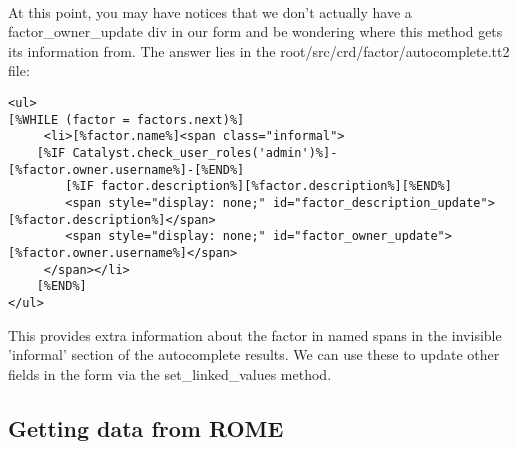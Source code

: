 \paragraph*{}
At this point, you may have notices that we don't actually have a factor\_owner\_update div in our form and be wondering where this method gets its information from. The answer lies in the root/src/crd/factor/autocomplete.tt2 file:

\begin{verbatim}
<ul>
[%WHILE (factor = factors.next)%]
     <li>[%factor.name%]<span class="informal">
	[%IF Catalyst.check_user_roles('admin')%]-[%factor.owner.username%]-[%END%]
        [%IF factor.description%][%factor.description%][%END%]
        <span style="display: none;" id="factor_description_update">[%factor.description%]</span>
        <span style="display: none;" id="factor_owner_update">[%factor.owner.username%]</span>
     </span></li>  
    [%END%]
</ul>
\end{verbatim}
 
This provides extra information about the factor in named spans in the invisible 'informal' section of the autocomplete results. We can use these to update other fields in the form via the set\_linked\_values method. 








\subsection{Getting data from ROME}

